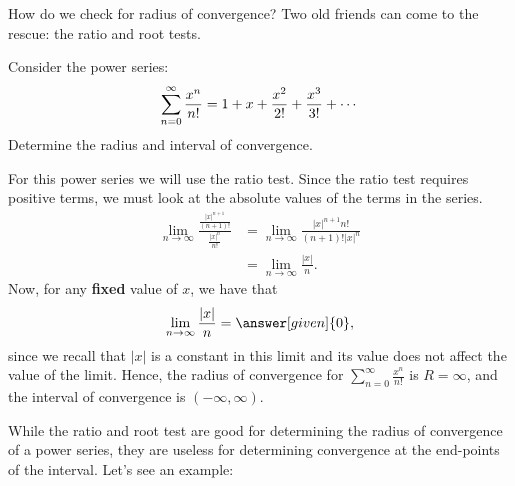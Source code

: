 \documentclass{ximera}
\begin{document}
How do we check for radius of convergence? Two old friends can come to
the rescue: the ratio and root tests.

\begin{example}
  Consider the power series:
  \[
  \sum_{n=0}^\infty \frac{x^n}{n!} = 1 + x + \frac{x^2}{2!} + \frac{x^3}{3!} + \cdots\\
  \]
  Determine the radius and interval of convergence.
  \begin{explanation}
    For this power series we will use the ratio test. Since the ratio test 
    requires positive terms, we must look at the absolute values of the terms in the
    series.
    \begin{align*}
      \lim_{n\to\infty} \frac{\frac{|x|^{n+1}}{(n+1)!}}{\frac{|x|^n}{n!}}
      &= \lim_{n\to\infty} \frac{|x|^{n+1}n!}{(n+1)!|x|^n}\\
      &= \lim_{n\to\infty} \frac{|x|}{n}.
    \end{align*}
    Now, for any \textbf{fixed} value of $x$, we have that
    \[
    \lim_{n\to\infty} \frac{|x|}{n} = \answer[given]{0},
    \]
    since we recall that $|x|$ is a constant in this limit and its value 
    does not affect the value of the limit.  Hence, the radius of convergence for $\sum_{n=0}^\infty
    \frac{x^n}{n!}$ is $R=\infty$, and the interval of convergence is $(-\infty, \infty)$.
  \end{explanation}
\end{example}

While the ratio and root test are good for determining the radius of
convergence of a power series, they are useless for determining
convergence at the end-points of the interval. Let's see an example:
\end{document}
